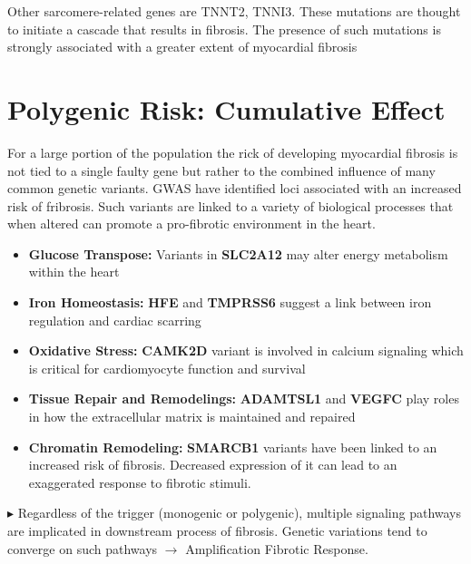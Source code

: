 \documentclass[../main.tex]{subfiles}
\begin{document}
Other sarcomere-related genes are TNNT2, TNNI3. These mutations are thought to initiate a cascade that results in fibrosis. The presence of such mutations is strongly associated with a greater extent of myocardial fibrosis

\section{Polygenic Risk: Cumulative Effect} 

For a large portion of the population the rick of developing myocardial fibrosis is not tied to a single faulty gene but rather to the combined influence of many common genetic variants. GWAS have identified loci associated with an increased risk of fribrosis. Such variants are linked to a variety of biological processes that when altered can promote a pro-fibrotic environment in the heart.

\begin{itemize}
    \item \textbf{Glucose Transpose:} Variants in \textbf{SLC2A12} may alter energy metabolism within the heart 
    \item \textbf{Iron Homeostasis:} \textbf{HFE} and \textbf{TMPRSS6} suggest a link between iron regulation and cardiac scarring
    \item \textbf{Oxidative Stress:} \textbf{CAMK2D} variant is involved in calcium signaling which is critical for cardiomyocyte function and survival
    \item \textbf{Tissue Repair and Remodelings:} \textbf{ADAMTSL1} and \textbf{VEGFC} play roles in how the extracellular matrix is maintained and repaired
    \item \textbf{Chromatin Remodeling:} \textbf{SMARCB1} variants have been linked to an increased risk of fibrosis. Decreased expression of it can lead to an exaggerated response to fibrotic stimuli.
\end{itemize}

$\blacktriangleright$ Regardless of the trigger (monogenic or polygenic), multiple signaling pathways are implicated in downstream process of fibrosis. Genetic variations tend to converge on such pathways $\rightarrow$ Amplification Fibrotic Response.
\end{document}
